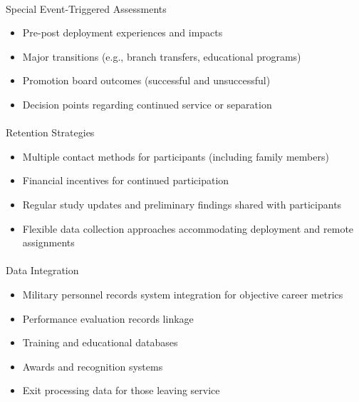 \documentclass[
  letterpaper,
  DIV=11,
  numbers=noendperiod]{scrartcl}
\makeatletter
\let\oldparagraph\paragraph
\renewcommand{\paragraph}{
    \@ifstar
      \xxxParagraphStar
      \xxxParagraphNoStar
  }
\newcommand{\xxxParagraphStar}[1]{\oldparagraph*{#1}\mbox{}}
\newcommand{\xxxParagraphNoStar}[1]{\oldparagraph{#1}\mbox{}}
\providecommand{\tightlist}{%
  \setlength{\itemsep}{0pt}\setlength{\parskip}{0pt}}
\makeatother
\begin{document}
\paragraph{Special Event-Triggered
Assessments}\label{special-event-triggered-assessments}

\begin{itemize}
\tightlist
\item
  Pre-post deployment experiences and impacts
\item
  Major transitions (e.g., branch transfers, educational programs)
\item
  Promotion board outcomes (successful and unsuccessful)
\item
  Decision points regarding continued service or separation
\end{itemize}

\paragraph{Retention Strategies}\label{retention-strategies}

\begin{itemize}
\tightlist
\item
  Multiple contact methods for participants (including family members)
\item
  Financial incentives for continued participation
\item
  Regular study updates and preliminary findings shared with
  participants
\item
  Flexible data collection approaches accommodating deployment and
  remote assignments
\end{itemize}

\paragraph{Data Integration}\label{data-integration}

\begin{itemize}
\tightlist
\item
  Military personnel records system integration for objective career
  metrics
\item
  Performance evaluation records linkage
\item
  Training and educational databases
\item
  Awards and recognition systems
\item
  Exit processing data for those leaving service
\end{itemize}
\end{document}
